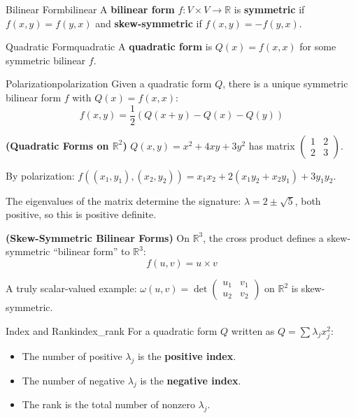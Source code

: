 \documentclass[11pt, letterpaper, openany]{book}
\begin{document}
\begin{defn}{Bilinear Form}{bilinear}
A \textbf{bilinear form} $f: V \times V \to \mathbb{R}$ is \textbf{symmetric} if $f(x,y) = f(y,x)$ and \textbf{skew-symmetric} if $f(x,y) = -f(y,x)$.
\end{defn}

\begin{defn}{Quadratic Form}{quadratic}
A \textbf{quadratic form} is $Q(x) = f(x,x)$ for some symmetric bilinear $f$.
\end{defn}

\begin{thm}{Polarization}{polarization}
Given a quadratic form $Q$, there is a unique symmetric bilinear form $f$ with $Q(x) = f(x,x)$:
\[
f(x,y) = \frac{1}{2}(Q(x+y) - Q(x) - Q(y))
\]
\end{thm}

\begin{example}
\textbf{(Quadratic Forms on $\mathbb{R}^2$)}
$Q(x,y) = x^2 + 4xy + 3y^2$ has matrix $\begin{pmatrix} 1 & 2 \\ 2 & 3 \end{pmatrix}$.

By polarization: $f((x_1, y_1), (x_2, y_2)) = x_1 x_2 + 2(x_1 y_2 + x_2 y_1) + 3y_1 y_2$.

The eigenvalues of the matrix determine the signature: $\lambda = 2 \pm \sqrt{5}$, both positive, so this is positive definite.
\end{example}

\begin{example}
\textbf{(Skew-Symmetric Bilinear Forms)}
On $\mathbb{R}^3$, the cross product defines a skew-symmetric ``bilinear form'' to $\mathbb{R}^3$:
\[f(u, v) = u \times v\]

A truly scalar-valued example: $\omega(u, v) = \det \begin{pmatrix} u_1 & v_1 \\ u_2 & v_2 \end{pmatrix}$ on $\mathbb{R}^2$ is skew-symmetric.
\end{example}

\begin{defn}{Index and Rank}{index_rank}
For a quadratic form $Q$ written as $Q = \sum \lambda_j x_j^2$:
\begin{itemize}
    \item The number of positive $\lambda_j$ is the \textbf{positive index}.
    \item The number of negative $\lambda_j$ is the \textbf{negative index}.
    \item The rank is the total number of nonzero $\lambda_j$.
\end{itemize}
\end{defn}
\end{document}
